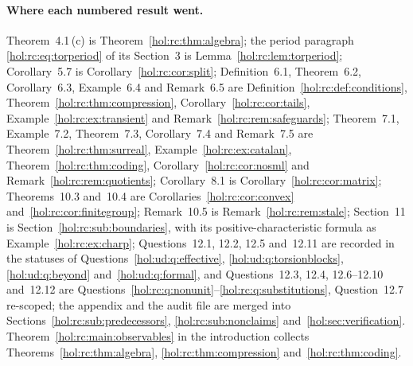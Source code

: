 \documentclass[11pt]{article}
\numberwithin{equation}{section}
\theoremstyle{definition}
\theoremstyle{remark}
\begin{document}
\paragraph{Where each numbered result went.}
Theorem~4.1\,(c) is Theorem~\ref{hol:rc:thm:algebra}; the period paragraph
\eqref{hol:rc:eq:torperiod} of its Section~3 is Lemma~\ref{hol:rc:lem:torperiod};
Corollary~5.7 is Corollary~\ref{hol:rc:cor:split}; Definition~6.1,
Theorem~6.2, Corollary~6.3, Example~6.4 and Remark~6.5 are
Definition~\ref{hol:rc:def:conditions}, Theorem~\ref{hol:rc:thm:compression},
Corollary~\ref{hol:rc:cor:tails}, Example~\ref{hol:rc:ex:transient} and
Remark~\ref{hol:rc:rem:safeguards}; Theorem~7.1, Example~7.2, Theorem~7.3,
Corollary~7.4 and Remark~7.5 are Theorem~\ref{hol:rc:thm:surreal},
Example~\ref{hol:rc:ex:catalan}, Theorem~\ref{hol:rc:thm:coding},
Corollary~\ref{hol:rc:cor:nosml} and Remark~\ref{hol:rc:rem:quotients};
Corollary~8.1 is Corollary~\ref{hol:rc:cor:matrix}; Theorems~10.3 and~10.4
are Corollaries~\ref{hol:rc:cor:convex} and~\ref{hol:rc:cor:finitegroup};
Remark~10.5 is Remark~\ref{hol:rc:rem:stale}; Section~11 is
Section~\ref{hol:rc:sub:boundaries}, with its positive-characteristic formula
as Example~\ref{hol:rc:ex:charp}; Questions~12.1, 12.2, 12.5 and~12.11 are
recorded in the statuses of Questions~\ref{hol:ud:q:effective},
\ref{hol:ud:q:torsionblocks}, \ref{hol:ud:q:beyond}
and~\ref{hol:ud:q:formal}, and Questions~12.3, 12.4, 12.6--12.10 and~12.12 are
Questions~\ref{hol:rc:q:nonunit}--\ref{hol:rc:q:substitutions}, Question~12.7
re-scoped; the appendix and the audit file are merged into
Sections~\ref{hol:rc:sub:predecessors}, \ref{hol:rc:sub:nonclaims}
and~\ref{hol:sec:verification}. Theorem~\ref{hol:rc:main:observables} in the
introduction collects Theorems~\ref{hol:rc:thm:algebra},
\ref{hol:rc:thm:compression} and~\ref{hol:rc:thm:coding}.
\end{document}
